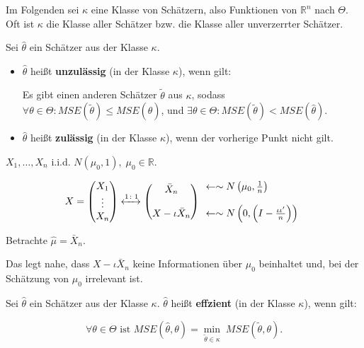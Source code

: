 \documentclass{tstextbook}
\newcommand{\R}{\mathbb R}
\begin{document}
Im Folgenden sei $ \kappa $ eine Klasse von Schätzern, also Funktionen von $ \R^n $ nach $ \Theta $. Oft ist $\kappa$ die Klasse aller Schätzer bzw. die Klasse aller unverzerrter Schätzer. 

\begin{definition}
	Sei $ \hat{\theta} $ ein Schätzer aus der Klasse $\kappa$. 
	\begin{itemize}
		\item $\hat{\theta}$ heißt \textbf{unzulässig}  (in der Klasse $\kappa$), wenn gilt: 
		
		Es gibt einen anderen Schätzer $\tilde{\theta}$ aus $\kappa$, sodass $\forall\theta\in\Theta \colon MSE(\tilde{\theta})\le MSE(\hat{\theta}) $, und $ \exists\theta\in\Theta \colon MSE(\tilde{\theta}) < MSE(\hat{\theta}) $.
		\item $ \hat{\theta} $ heißt \textbf{zulässig} (in der Klasse $\kappa$), wenn der vorherige Punkt nicht gilt.
	\end{itemize}
\end{definition}

\begin{example}
	$ X_1,\ldots,X_n $ i.i.d. $ N(\mu_0,1), \; \mu_0 \in \R $. 
	
	\[
	X = \begin{pmatrix}
		X_1 \\ \vdots \\ X_n
	\end{pmatrix} \xleftrightarrow{1\colon1} \begin{pmatrix}
	\bar{X}_n \\ \\ X - \iota\bar{X}_n
\end{pmatrix} \begin{array}{l}
\leftarrow \sim N\left(\mu_0,\frac{1}{n}\right)  \\ \\ \leftarrow \sim N\left(0, \left(I-\frac{\iota\iota^\prime}{n}\right)\right)
\end{array}
	\]
	
	Betrachte $ \hat{\mu} = \bar{X}_n $. 
	
	Das legt nahe, dass $ X-\iota\bar{X}_n $ keine Informationen über $ \mu_0 $ beinhaltet und, bei der Schätzung von $ \mu_0 $ irrelevant ist.
\end{example}

\begin{definition}
	Sei $ \hat{\theta} $ ein Schätzer aus der Klasse $\kappa$. $\hat{\theta}$ heißt \textbf{effzient}  (in der Klasse $\kappa$), wenn gilt:
	
	\[ \forall\theta \in\Theta \text{ ist } MSE\left(\hat{\theta}, \theta\right) = \underset{\tilde{\theta}\in\kappa}{\min}\; MSE\left(\tilde{\theta},\theta\right). \] 
\end{definition}
\end{document}
